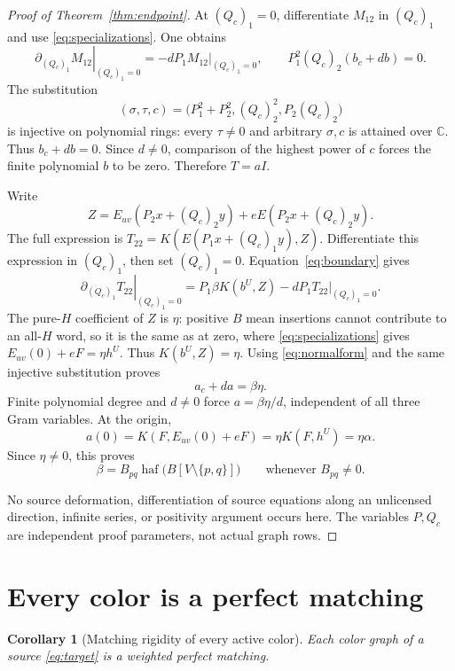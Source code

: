 \documentclass[11pt]{article}
\newtheorem{corollary}[theorem]{Corollary}
\numberwithin{equation}{section}
\begin{document}
\begin{proof}[Proof of Theorem~\ref{thm:endpoint}]
At \((Q_c)_1=0\), differentiate \(M_{12}\) in \((Q_c)_1\) and use
\eqref{eq:specializations}. One obtains
\[
 \left.\partial_{(Q_c)_1}M_{12}\right|_{(Q_c)_1=0}
       =-dP_1\left.M_{12}\right|_{(Q_c)_1=0},
 \qquad P_1^2(Q_c)_2(b_c+db)=0.
\]
The substitution
\[
 (\sigma,\tau,c)=\bigl(P_1^2+P_2^2,(Q_c)_2^2,P_2(Q_c)_2\bigr)
\]
is injective on polynomial rings: every \(\tau\ne0\) and arbitrary
\(\sigma,c\) is attained over \(\mathbb C\). Thus \(b_c+db=0\).
Since \(d\ne0\), comparison of the highest power of \(c\) forces the
finite polynomial \(b\) to be zero. Therefore \(T=aI\).

Write
\[
 Z=E_{uv}(P_2x+(Q_c)_2y)+eE(P_2x+(Q_c)_2y).
\]
The full expression is \(T_{22}=K(E(P_1x+(Q_c)_1y),Z)\). Differentiate
this expression in \((Q_c)_1\), then set \((Q_c)_1=0\).
Equation~\eqref{eq:boundary} gives
\[
 \left.\partial_{(Q_c)_1}T_{22}\right|_{(Q_c)_1=0}
 =P_1\beta K(b^U,Z)-dP_1\left.T_{22}\right|_{(Q_c)_1=0}.
\]
The pure-\(H\) coefficient of \(Z\) is \(\eta\): positive \(B\) mean
insertions cannot contribute to an all-\(H\) word, so it is the same as
at zero, where \eqref{eq:specializations} gives
\(E_{uv}(0)+eF=\eta h^U\). Thus \(K(b^U,Z)=\eta\). Using
\eqref{eq:normalform} and the same injective substitution proves
\[
 a_c+da=\beta\eta.
\]
Finite polynomial degree and \(d\ne0\) force \(a=\beta\eta/d\), independent
of all three Gram variables. At the origin,
\[
 a(0)=K(F,E_{uv}(0)+eF)=\eta K(F,h^U)=\eta\alpha.
\]
Since \(\eta\ne0\), this proves
\begin{equation}
 \beta=B_{pq}\operatorname{haf}\bigl(B[V\setminus\{p,q\}]\bigr)
 \qquad\text{whenever }B_{pq}\ne0.
 \tag{10}\label{eq:endpoint}
\end{equation}

No source deformation, differentiation of source equations along an
unlicensed direction, infinite series, or positivity argument occurs here.
The variables \(P,Q_c\) are independent proof parameters, not actual graph rows.
\end{proof}

\section{Every color is a perfect matching}\label{sec:matching}

\begin{corollary}[Matching rigidity of every active color]\label{cor:matching}
Each color graph of a source \eqref{eq:target} is a weighted perfect matching.
\end{corollary}
\end{document}
